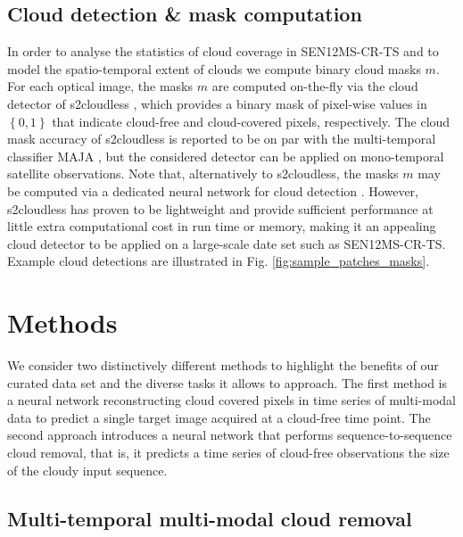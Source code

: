 \documentclass[journal]{IEEEtran}
\begin{document}
\subsection{Cloud detection \& mask computation} \label{sub:cloudmask}
In order to analyse the statistics of cloud coverage in SEN12MS-CR-TS and to model the spatio-temporal extent of clouds we compute binary cloud masks $m$. For each optical image, the masks $m$ are computed on-the-fly via the cloud detector of s2cloudless \cite{Zupanc}, which provides a binary mask of pixel-wise values in $\left \{ 0,1 \right \}$ that indicate cloud-free and cloud-covered pixels, respectively. The cloud mask accuracy of s2cloudless is reported to be on par with the multi-temporal classifier MAJA \cite{lonjou2016maccs}, but the considered detector can be applied on mono-temporal satellite observations. Note that, alternatively to s2cloudless, the masks $m$ may be computed via a dedicated neural network for cloud detection \cite{jeppesen2019cloud, lopez2021benchmarking}. However, s2cloudless has proven to be lightweight and provide sufficient performance at little extra computational cost in run time or memory, making it an appealing cloud detector to be applied on a large-scale date set such as SEN12MS-CR-TS. Example cloud detections are illustrated in Fig. \ref{fig:sample_patches_masks}.


\section{Methods} \label{methods}

We consider two distinctively different methods to highlight the benefits of our curated data set and the diverse tasks it allows to approach. The first method is a neural network reconstructing cloud covered pixels in time series of multi-modal data to predict a single target image acquired at a cloud-free time point. The second approach introduces a neural network that performs sequence-to-sequence cloud removal, that is, it predicts a time series of cloud-free observations the size of the cloudy input sequence.

\subsection{Multi-temporal multi-modal cloud removal}\label{method:seq2point}
\end{document}
